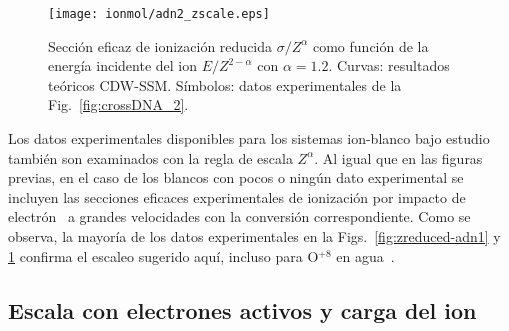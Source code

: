 \begin{figure}
\centering
\texttt{[image: ionmol/adn2\_zscale.eps]}
\caption[Sección eficaz de ionización reducida por $Z$ y $\alpha$ 
(Parte II).]
{Sección eficaz de ionización reducida $\sigma/Z^{\alpha}$ como función
de la energía incidente del ion $E/Z^{2-\alpha}$ con $\alpha=1.2$. 
Curvas: resultados teóricos CDW-SSM. 
Símbolos: datos experimentales de la Fig.~\ref{fig:crossDNA_2}.}
\label{fig:zreduced-adn2}
\end{figure} 

Los datos experimentales disponibles para los sistemas ion-blanco bajo 
estudio~\cite{Iriki:11,Sens:20,Bhattacharjee:19,itoh2013,wolff2014,
wang2016,agnihotri2012,agnihotri2013,Luna2007,Bolorizadeh86,H_Rudd85,
He_Rudd85,toburen80,Ohsawa05,Bhattacharjee:17,DalCappello:09,
Bhattacharjee:16} también son examinados con la regla de escala 
$Z^\alpha$. Al igual que en las figuras previas, en el caso de los 
blancos con pocos o ningún dato experimental se incluyen las secciones 
eficaces experimentales de ionización por impacto de 
electrón~\cite{Rahman:16,bug2017,wolf2019,fuss2009} a grandes 
velocidades con la conversión correspondiente. Como se observa, la 
mayoría de los datos experimentales en la Figs.~\ref{fig:zreduced-adn1} 
y \ref{fig:zreduced-adn2} confirma el escaleo sugerido aquí, incluso 
para O$^{+8}$ en agua~\cite{Bhattacharjee:16}. 

\subsection{Escala con electrones activos y carga del ion}
\label{sec:nez_scaling}

